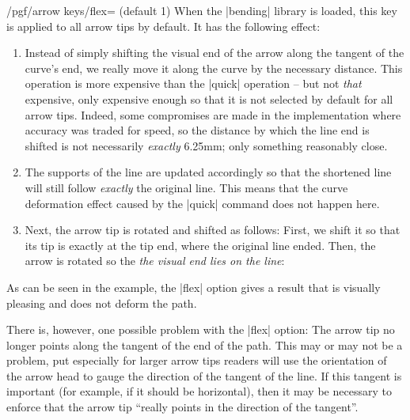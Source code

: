 \begin{codeexample}
    \usetikzlibrary{bending}
\end{codeexample}
%
\begin{key}{/pgf/arrow keys/flex= (default 1)}
    When the |bending| library is loaded, this key is applied to all arrow tips
    by default. It has the following effect:
    \begin{enumerate}
        \item Instead of simply shifting the visual end of the arrow along
            the tangent of the curve's end, we really move it along the curve
            by the necessary distance. This operation is more expensive than
            the |quick| operation -- but not \emph{that} expensive, only
            expensive enough so that it is not selected by default for all
            arrow tips. Indeed, some compromises are made in the
            implementation where accuracy was traded for speed, so the
            distance by which the line end is shifted is not necessarily
            \emph{exactly} 6.25mm; only something reasonably close.
        \item The supports of the line are updated accordingly so that the
            shortened line will still follow \emph{exactly} the original
            line. This means that the curve deformation effect caused by the
            |quick| command does not happen here.
        \item Next, the arrow tip is rotated and shifted as follows: First,
            we shift it so that its tip is exactly at the tip end, where the
            original line ended. Then, the arrow is rotated so the \emph{the
            visual end lies on the line}:
\begin{codeexample}[]
\end{codeexample}
    \end{enumerate}

    As can be seen in the example, the |flex| option gives a result that is
    visually pleasing and does not deform the path.

    There is, however, one possible problem with the |flex| option: The arrow
    tip no longer points along the tangent of the end of the path. This may or
    may not be a problem, put especially for larger arrow tips readers will use
    the orientation of the arrow head to gauge the direction of the tangent of
    the line. If this tangent is important (for example, if it should be
    horizontal), then it may be necessary to enforce that the arrow tip
    ``really points in the direction of the tangent''.


\end{key}
